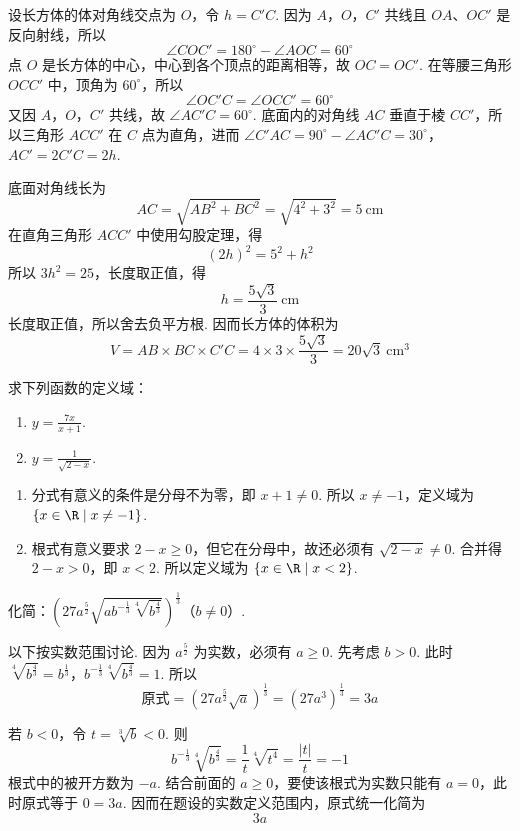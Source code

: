 \begin{solution}
设长方体的体对角线交点为 \(O\)，令 \(h=C'C\). 因为 \(A\)，\(O\)，\(C'\) 共线且 \(OA\)、\(OC'\) 是反向射线，所以
\[
\angle COC'=180^\circ-\angle AOC=60^\circ
\]
点 \(O\) 是长方体的中心，中心到各个顶点的距离相等，故 \(OC=OC'\). 在等腰三角形 \(OCC'\) 中，顶角为 \(60^\circ\)，所以
\[
\angle OC'C=\angle OCC'=60^\circ
\]
又因 \(A\)，\(O\)，\(C'\) 共线，故 \(\angle AC'C=60^\circ\). 底面内的对角线 \(AC\) 垂直于棱 \(CC'\)，所以三角形 \(ACC'\) 在 \(C\) 点为直角，进而
\(\angle C'AC=90^\circ-\angle AC'C=30^\circ\)，\(AC'=2C'C=2h\).

底面对角线长为
\[
AC=\sqrt{AB^2+BC^2}=\sqrt{4^2+3^2}=5\mathrm{~cm}
\]
在直角三角形 \(ACC'\) 中使用勾股定理，得
\[
(2h)^2=5^2+h^2
\]
所以 \(3h^2=25\)，长度取正值，得
\[
h=\frac{5\sqrt{3}}{3}\mathrm{~cm}
\]
长度取正值，所以舍去负平方根. 因而长方体的体积为
\[
V=AB\times BC\times C'C
 =4\times3\times\frac{5\sqrt{3}}{3}
 =20\sqrt{3}\mathrm{~cm}^3
\]
\end{solution}

\begin{problem}
求下列函数的定义域：

\begin{enumerate}
    \item \( y=\frac{7x}{x+1} \).
    \item \( y=\frac{1}{\sqrt{2-x}} \).
\end{enumerate}
\end{problem}

\begin{solution}
\begin{enumerate}
    \item 分式有意义的条件是分母不为零，即 \(x+1\neq0\). 所以 \(x\neq-1\)，定义域为
    \(\{x\in\R\mid x\neq-1\}\).
    \item 根式有意义要求 \(2-x\geqslant0\)，但它在分母中，故还必须有 \(\sqrt{2-x}\neq0\). 合并得
    \(2-x>0\)，即 \(x<2\). 所以定义域为 \(\{x\in\R\mid x<2\}\).
\end{enumerate}
\end{solution}

\begin{problem}
化简：\( \left( 27a^{\frac{5}{2}}\sqrt{ab^{-\frac{1}{3}}\sqrt[4]{b^{\frac{4}{3}}}} \right)^{\frac{1}{3}} \)（\(b\neq0\)）.
\end{problem}

\begin{solution}
以下按实数范围讨论. 因为 \(a^{\frac{5}{2}}\) 为实数，必须有 \(a\geqslant0\). 先考虑 \(b>0\). 此时
\(\sqrt[4]{b^{\frac{4}{3}}}=b^{\frac{1}{3}}\)，\(b^{-\frac{1}{3}}\sqrt[4]{b^{\frac{4}{3}}}=1\).
所以
\[
\text{原式}=\left(27a^{\frac{5}{2}}\sqrt{a}\right)^{\frac{1}{3}}
 =\left(27a^3\right)^{\frac{1}{3}}=3a
\]

若 \(b<0\)，令 \(t=\sqrt[3]{b}<0\). 则
\[
b^{-\frac{1}{3}}\sqrt[4]{b^{\frac{4}{3}}}
 =\frac{1}{t}\sqrt[4]{t^4}
 =\frac{|t|}{t}=-1
\]
根式中的被开方数为 \(-a\). 结合前面的 \(a\geqslant0\)，要使该根式为实数只能有 \(a=0\)，此时原式等于 \(0=3a\). 因而在题设的实数定义范围内，原式统一化简为
\[
3a
\]
\end{solution}

